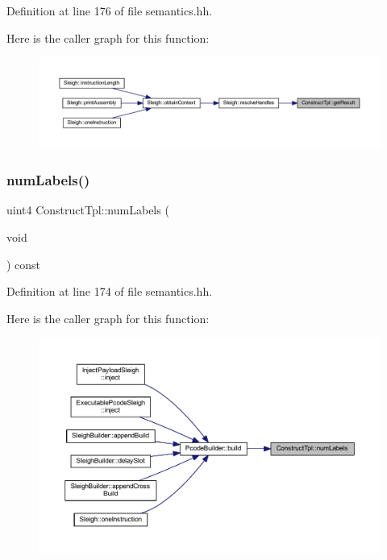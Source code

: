 Definition at line 176 of file semantics.\+hh.

Here is the caller graph for this function\+:
\nopagebreak
\begin{figure}[H]
\begin{center}
\leavevmode
\includegraphics[width=350pt]{class_construct_tpl_a1d7e73bdea2a98c688276a87fc18f614_icgraph}
\end{center}
\end{figure}
\mbox{\label{class_construct_tpl_aae30d682cb8171ae594cd9e031b39061}} 
\subsubsection{\texorpdfstring{numLabels()}{numLabels()}}
{\footnotesize\ttfamily uint4 Construct\+Tpl\+::num\+Labels (\begin{DoxyParamCaption}\item[{void}]{ }\end{DoxyParamCaption}) const\hspace{0.3cm}{\ttfamily [inline]}}



Definition at line 174 of file semantics.\+hh.

Here is the caller graph for this function\+:
\nopagebreak
\begin{figure}[H]
\begin{center}
\leavevmode
\includegraphics[width=350pt]{class_construct_tpl_aae30d682cb8171ae594cd9e031b39061_icgraph}
\end{center}
\end{figure}
\mbox{\label{class_construct_tpl_a0e22f6df1e5fb8ab5fe763b3f68dd1fa}} 
